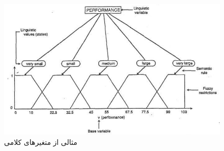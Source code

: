   	\begin{figure}[h]
  	\centering 
  	\includegraphics[width=125mm]{Images/Fig19.png}
  	\vspace{-0.5cm}
  	\caption{مثالی از متغیرهای کلامی}\label{fig:f_19}
  \end{figure}

